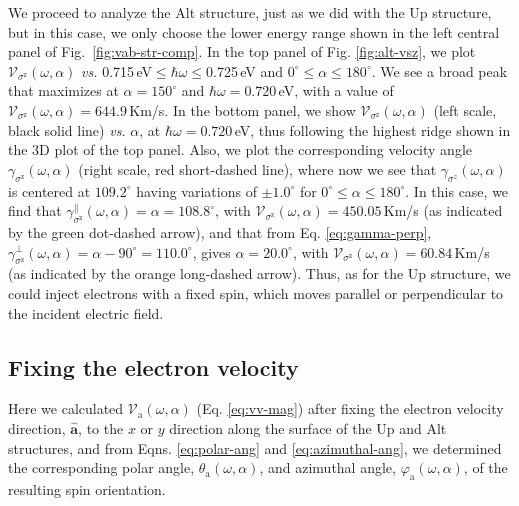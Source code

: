 \documentclass[floatfix,prb,aps,superscriptaddress,showpacs,11pt,preprint,letterpaper]{revtex4}
\begin{document}
We proceed to analyze the Alt structure, just as we did with the Up structure,
but in this case, we only choose the lower energy range shown in the left
central panel of Fig.~\ref{fig:vab-str-comp}. In the top panel of Fig. 
\ref{fig:alt-vsz}, we plot $\mathcal{V}_{\sigma^{\mathrm{z}}} (\omega,\alpha)$
{\it vs.} 0.715\,eV$\leq\hbar\omega\leq$0.725\,eV and $0^\circ\leq\alpha\leq
180^\circ$. We see a broad peak that maximizes at $\alpha=150^{\circ}$ and
$\hbar\omega= 0.720$\,eV, with a value of
$\mathcal{V}_{\sigma^{\mathrm{z}}}(\omega,\alpha) = 644.9$\,Km/s. In the bottom
panel, we  show $\mathcal{V}_{\sigma^{\mathrm{z}}} (\omega,\alpha)$ (left scale, black solid line) {\it vs.}
$\alpha$, at $\hbar\omega= 0.720$\,eV, thus following
the highest ridge shown in the 3D plot of the top panel. Also, we plot the
corresponding velocity angle $\gamma_{\sigma^\mathrm{z}} (\omega,\alpha)$
(right scale, red short-dashed  line), where now we see that
$\gamma_{\sigma^z}(\omega,\alpha)$ is centered at $109.2^{\circ}$ having
variations of $\pm 1.0^{\circ}$ for $0^{\circ} \leq
\alpha \leq 180^{\circ}$. In this case, we find that
$\gamma^\parallel_{\sigma^\mathrm{z}} (\omega,\alpha) =
\alpha = 108.8^\circ$, with $\mathcal{V}_{\sigma^{\mathrm{z}}} (\omega,\alpha)
= 450.05$\,Km/s (as indicated by the  green dot-dashed arrow), 
and that from Eq. \eqref{eq:gamma-perp},
$\gamma^\perp_{\sigma^\mathrm{z}}(\omega,\alpha)=\alpha-90^\circ=110.0^\circ$,
gives $\alpha=20.0^\circ$, with $\mathcal{V}_{\sigma^{\mathrm{z}}}
(\omega,\alpha) = 60.84$\,Km/s 
(as indicated by the orange long-dashed  arrow). Thus, as for the Up structure,
we could inject electrons with a fixed spin, which moves parallel or
perpendicular to the incident electric field.

\subsection{Fixing the electron velocity} 
\label{sec:res-fixvel}

Here we calculated $\mathcal{V}_{\mathrm{a}}(\omega,\alpha)$ (Eq. 
\eqref{eq:vv-mag}) after fixing the electron velocity direction, $\hat{\mathbf{a}}$,
to the $x$ or $y$ direction along the surface of the Up and Alt structures,
and from Eqns. \eqref{eq:polar-ang} and \eqref{eq:azimuthal-ang}, 
we
determined the corresponding polar angle, $\theta_{\mathrm{a}}
(\omega,\alpha)$, and azimuthal angle, $\varphi_{\mathrm{a}}
(\omega,\alpha)$, of the resulting spin orientation.
\end{document}
